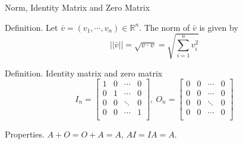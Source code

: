 \documentclass[11pt,aspectratio=169]{beamer}
\begin{document}
    \begin{frame}[t]{Norm, Identity Matrix and Zero Matrix}
        \par \textcolor{yy}{Definition.} Let $\bar{v} = (v_1,\cdots,v_n) \in \mathbb{R}^n$. The \textcolor{yy}{norm} of $\bar{v}$ is given by 
        \begin{equation*}
            ||\bar{v}|| = \sqrt{v \cdot v} = \sqrt{\sum\limits_{i=1}^{n} v_i^2}
        \end{equation*}

        \phantom{yy} 

        \par \textcolor{yy}{Definition.} \textcolor{yy}{Identity matrix} and \textcolor{yy}{zero matrix}
        \begin{equation*}
            I_n = \left[ 
                \begin{array}{cccc}
                    1 & 0 & \cdots & 0 \\ 
                    0 & 1 & \cdots & 0 \\ 
                    0 & 0 & \ddots & 0 \\ 
                    0 & 0 & \cdots & 1 \\
                \end{array}
            \right], \ O_n = \left[ 
                \begin{array}{cccc}
                    0 & 0 & \cdots & 0 \\ 
                    0 & 0 & \cdots & 0 \\ 
                    0 & 0 & \ddots & 0 \\ 
                    0 & 0 & \cdots & 0 \\
                \end{array}
            \right]
        \end{equation*}
    
    \phantom{yy} 
    
    \par \textcolor{yy}{Properties.} $A + O = O + A = A$, $AI = IA = A$. 
    \end{frame}
    
\end{document}
